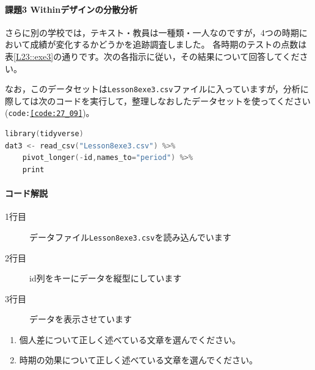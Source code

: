 \documentclass{ltjbook}
\begin{document}
\paragraph{課題3 Withinデザインの分散分析}
さらに別の学校では，テキスト・教員は一種類・一人なのですが，4つの時期において成績が変化するかどうかを追跡調査しました。
各時期のテストの点数は表\ref{L23::exe3}の通りです。次の各指示に従い，その結果について回答してください。

なお，このデータセットは\texttt{Lesson8exe3.csv}ファイルに入っていますが，分析に際しては次のコードを実行して，整理しなおしたデータセットを使ってください(\texttt{code:\ref{code:27_09}})。
\begin{lstlisting}[language=c++,label={code:27_09},caption={データを外部ファイルから読み込んで実行する}]
library(tidyverse)
dat3 <- read_csv("Lesson8exe3.csv") %>% 
    pivot_longer(-id,names_to="period") %>% 
    print
\end{lstlisting}
\paragraph{コード解説}
\begin{description}
	\item[1行目] データファイル\texttt{Lesson8exe3.csv}を読み込んでいます
	\item[2行目] id列をキーにデータを縦型にしています
	\item[3行目] データを表示させています
\end{description}
\begin{enumerate}
	\item 個人差について正しく述べている文章を選んでください。
	\item 時期の効果について正しく述べている文章を選んでください。
\end{enumerate}
\end{document}
